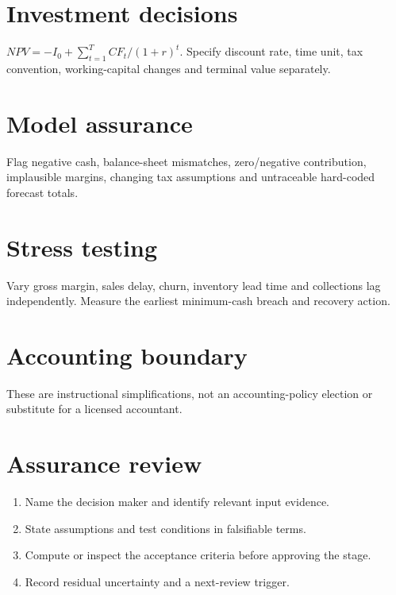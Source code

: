 \documentclass[11pt]{article}
\begin{document}
\section{Investment decisions}
$NPV=-I_0+\sum_{t=1}^{T}CF_t/(1+r)^t$. Specify discount rate, time unit, tax convention, working-capital changes and terminal value separately.
\section{Model assurance}
Flag negative cash, balance-sheet mismatches, zero/negative contribution, implausible margins, changing tax assumptions and untraceable hard-coded forecast totals.
\section{Stress testing}
Vary gross margin, sales delay, churn, inventory lead time and collections lag independently. Measure the earliest minimum-cash breach and recovery action.
\section{Accounting boundary}
These are instructional simplifications, not an accounting-policy election or substitute for a licensed accountant.
\section{Assurance review}
\begin{enumerate}[leftmargin=*,itemsep=5pt]
\item Name the decision maker and identify relevant input evidence.
\item State assumptions and test conditions in falsifiable terms.
\item Compute or inspect the acceptance criteria before approving the stage.
\item Record residual uncertainty and a next-review trigger.
\end{enumerate}
\end{document}
